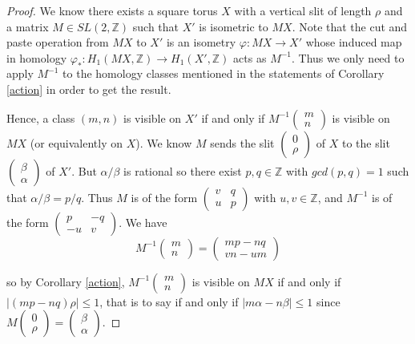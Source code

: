 \documentclass{article}
\newcommand{\ZZ}{\mathbb{Z}}
\theoremstyle{definition}
\begin{document}
\begin{proof}
We know there exists a square torus $X$ with a vertical slit of length $\rho$ and a matrix $M\in SL(2,\ZZ)$ such that $X'$ is isometric to $MX$.
Note that the cut and paste operation from $MX$ to $X'$ is an isometry $\varphi : MX \longrightarrow X'$ whose induced map in homology $\varphi_* : H_1(MX,\ZZ) \longrightarrow H_1(X',\ZZ)$ acts as $M^{-1}$. Thus we only need to apply $M^{-1}$ to the homology classes mentioned in the statements of Corollary \ref{action} in order to get the result. 
\newline


Hence, a class $(m,n)$ is visible on $X'$ if and only if $M^{-1} \begin{pmatrix} m \\ n \end{pmatrix}$ is visible on $MX$ (or equivalently on $X$). We know $M$ sends the slit $\begin{pmatrix} 0 \\ \rho \end{pmatrix}$ of $X$ to the slit $\begin{pmatrix}
    \beta \\ \alpha
\end{pmatrix}$ of $X'$. But $\alpha / \beta$ is rational so there exist $p,q\in \ZZ$ with $gcd(p,q)=1$ such that $\alpha / \beta = p/ q$. Thus $M$ is of the form $\begin{pmatrix}
    v & q \\ u & p 
\end{pmatrix}$ with $u,v\in \ZZ$, and $M^{-1}$ is of the form $\begin{pmatrix}
    p & -q \\ -u & v
\end{pmatrix}$.
We have 
$$M^{-1} \begin{pmatrix} m \\ n \end{pmatrix} = \begin{pmatrix}
    mp-nq \\ vn-um
\end{pmatrix}$$

so by Corollary \ref{action}, $M^{-1} \begin{pmatrix} m \\ n \end{pmatrix}$ is visible on $MX$ if and only if $|(mp-nq)\rho| \le 1$, that is to say if and only if $|m\alpha - n\beta|\le 1$ since $M\begin{pmatrix} 0 \\ \rho \end{pmatrix} = \begin{pmatrix} \beta \\ \alpha \end{pmatrix}$. \newline


\end{proof}
\end{document}
